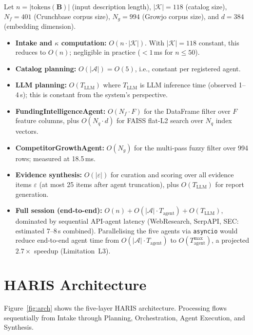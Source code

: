 \documentclass[preprint,12pt]{elsarticle}
\newcommand{\B}{\mathbf{B}}
\newcommand{\calK}{\mathcal{K}}
\newcommand{\calA}{\mathcal{A}}
\begin{document}
Let $n = |\text{tokens}(\B)|$ (input description length), $|\calK| = 118$
(catalog size), $N_f = 401$ (Crunchbase corpus size), $N_g = 994$ (Growjo
corpus size), and $d = 384$ (embedding dimension).

\begin{itemize}[nosep,leftmargin=1.5em]
  \item \textbf{Intake and $\kappa$ computation:} $O(n \cdot |\calK|)$.
        With $|\calK| = 118$ constant, this reduces to $O(n)$; negligible
        in practice ($< 1$\,ms for $n \le 50$).
  \item \textbf{Catalog planning:} $O(|\calA|) = O(5)$, i.e., constant
        per registered agent.
  \item \textbf{LLM planning:} $O(T_\text{LLM})$ where $T_\text{LLM}$ is
        LLM inference time (observed 1--4\,s); this is constant from the
        system's perspective.
  \item \textbf{FundingIntelligenceAgent:} $O(N_f \cdot F)$ for the
        DataFrame filter over $F$ feature columns, plus $O(N_q \cdot d)$
        for FAISS flat-L2 search over $N_q$ index vectors.
  \item \textbf{CompetitorGrowthAgent:} $O(N_g)$ for the multi-pass
        fuzzy filter over 994 rows; measured at 18.5\,ms.
  \item \textbf{Evidence synthesis:} $O(|\varepsilon|)$ for curation and
        scoring over all evidence items $\varepsilon$ (at most 25 items
        after agent truncation), plus $O(T_\text{LLM})$ for report generation.
  \item \textbf{Full session (end-to-end):} $O(n) + O(|\calA| \cdot T_\text{agent}) +
        O(T_\text{LLM})$, dominated by sequential API-agent latency
        (WebResearch, SerpAPI, SEC: estimated 7--8\,s combined). Parallelising
        the five agents via \texttt{asyncio} would reduce end-to-end agent
        time from $O(|\calA| \cdot T_\text{agent})$ to $O(T_\text{agent}^\text{max})$,
        a projected $2.7\times$ speedup (Limitation~L3).
\end{itemize}

\section{HARIS Architecture}
\label{sec:arch}

Figure~\ref{fig:arch} shows the five-layer HARIS architecture. Processing flows
sequentially from Intake through Planning, Orchestration, Agent Execution, and
Synthesis.
\end{document}
